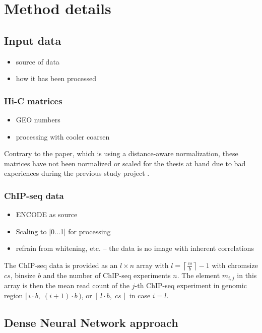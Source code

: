 \section{Method details}
\subsection{Input data}
\begin{itemize}
 \item source of data
 \item how it has been processed
\end{itemize}

\subsubsection{Hi-C matrices} \label{sec:methods:hicMatrices}
\begin{itemize}
 \item GEO numbers
 \item processing with cooler coarsen
\end{itemize}
Contrary to the paper, which is using a distance-aware normalization, 
these matrices have not been normalized or scaled for the thesis at hand
due to bad experiences during the previous study project \cite{Krauth2020}.

\subsubsection{ChIP-seq data} \label{sec:methods:chipseq}
\begin{itemize}
 \item ENCODE as source
 \item Scaling to [0...1] for processing
 \item refrain from whitening, etc. -- the data is no image with inherent correlations
\end{itemize}
The ChIP-seq data is provided as an $l\times n$ array with $l=\left \lceil{\frac{cs}{b}}\right \rceil -1$
with chromsize $cs$, binsize $b$ and the number of ChIP-seq experiments $n$. 
The element $m_{i,j}$ in this array is then the mean read count
of the $j$-th ChIP-seq experiment in genomic region $[\,i\cdot b, \; (i+1)\cdot b \,)$, or $[\,l\cdot b,\; cs\,]$ in case $i = l$.

\subsection{Dense Neural Network approach} \label{sec:methods:denseNN}
